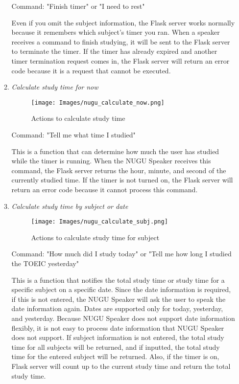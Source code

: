 \documentclass[conference]{IEEEtran}
\begin{document}
\begin{enumerate}
\begin{enumerate}
Command: "Finish timer" or "I need to rest"

Even if you omit the subject information, the Flask server works normally because it remembers which subject's timer you ran. When a speaker receives a command to finish studying, it will be sent to the Flask server to terminate the timer. If the timer has already expired and another timer termination request comes in, the Flask server will return an error code because it is a request that cannot be executed.\\

        
        \item \textit{Calculate study time for now}
        
                \begin{figure}[htp]
    \centering
    \texttt{[image: Images/nugu\_calculate\_now.png]}
    \caption{Actions to calculate study time}
\end{figure}

Command: "Tell me what time I studied"

This is a function that can determine how much the user has studied while the timer is running. When the NUGU Speaker receives this command, the Flask server returns the hour, minute, and second of the currently studied time. If the timer is not turned on, the Flask server will return an error code because it cannot process this command.\\


        
        \item \textit{Calculate study time by subject or date}
        
                \begin{figure}[htp]
    \centering
    \texttt{[image: Images/nugu\_calculate\_subj.png]}
    \caption{Actions to calculate study time for subject}
\end{figure}

Command: "How much did I study today" or "Tell me how long I studied the TOEIC yesterday"

This is a function that notifies the total study time or study time for a specific subject on a specific date. Since the date information is required, if this is not entered, the NUGU Speaker will ask the user to speak the date information again. Dates are supported only for today, yesterday, and yesterday. Because NUGU Speaker does not support date information flexibly, it is not easy to process date information that NUGU Speaker does not support. If subject information is not entered, the total study time for all subjects will be returned, and if inputted, the total study time for the entered subject will be returned. Also, if the timer is on, Flask server will count up to the current study time and return the total study time.\\



\end{enumerate}
\end{enumerate}
\end{document}
